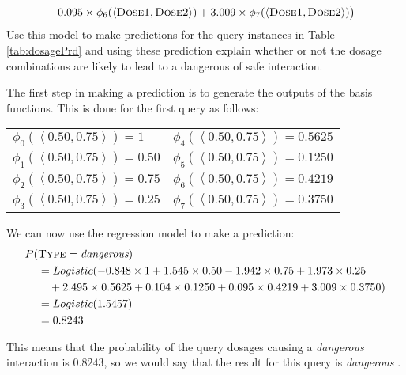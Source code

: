 \documentclass[solution]{ditpaper}
\begin{document}
\begin{enumerate}
\begin{alignat*}{2}
  & + 0.095 \times\phi_6(\mathbf{\left<\textsc{Dose1}, \textsc{Dose2}\right>})
  + 3.009\times\phi_7(\mathbf{\left<\textsc{Dose1}, \textsc{Dose2}\right>})\big) 
\end{alignat*}
Use this model to make predictions for the query instances in Table \ref{tab:dosagePrd} and using these prediction explain whether or not the dosage combinations are likely to lead to a dangerous of safe interaction.
		\begin{answer}
	The first step in making a prediction is to generate the outputs of the basis functions. This is done for the first query as follows:
			\begin{center}
\begin{tabular}[ht]{ l  l  }
$\phi_0(\left<0.50, 0.75\right>) =  1$ & $\phi_4(\left<0.50, 0.75\right>) = 0.5625$ \\
$\phi_1(\left<0.50, 0.75\right>) = 0.50$ & $\phi_5(\left<0.50, 0.75\right>) = 0.1250$ \\
$\phi_2(\left<0.50, 0.75\right>) = 0.75$ &$\phi_6(\left<0.50, 0.75\right>) = 0.4219$  \\
$\phi_3(\left<0.50, 0.75\right>) = 0.25$ & $\phi_7(\left<0.50, 0.75\right>) = 0.3750$ \\
\end{tabular}
\end{center}
	We can now use the regression model to make a prediction:
		\begin{alignat*}{2}				
P(&\textsc{Type}=\textit{dangerous}) \\
& = Logistic(-0.848\times 1 + 1.545 \times0.50 -1.942 \times0.75 + 1.973 \times0.25 \\
& ~~~ +  2.495   \times 0.5625 + 0.104 \times 0.1250 + 0.095 \times 0.4219 + 3.009\times0.3750) \\
 & = Logistic(1.5457)  \\
 & = 0.8243 
\end{alignat*}

\noindent This means that the probability of the query dosages causing a \textit{dangerous} interaction is $0.8243$, so we would say that the result for this query is  \textit{dangerous} . 


\end{answer}
\end{enumerate}
\end{document}
